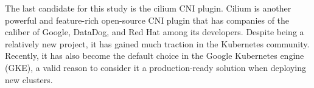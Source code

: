 

The last candidate for this study is the cilium CNI plugin. Cilium is another
powerful and feature-rich open-source CNI plugin that has companies of the
caliber of Google, DataDog, and Red Hat among its developers. Despite being a
relatively new project, it has gained much traction in the Kubernetes community.
Recently, it has also become the default choice in the Google Kubernetes engine
(GKE), a valid reason to consider it a production-ready solution when deploying
new clusters. 

